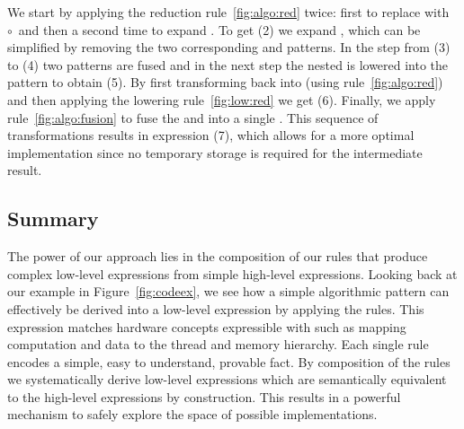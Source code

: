 We start by applying the reduction rule~\ref{fig:algo:red} twice:
first to replace \reduce with \reduce~$\circ$~\partRed and then a second time to expand \partRed.
To get (2) we expand \map, which can be simplified by removing the two corresponding \join and \splitN patterns.
In the step from (3) to (4) two \map patterns are fused and in the next step the nested \map is lowered into the \mapSeq pattern to obtain (5).
By first transforming \partRed back into \reduce (using rule~\ref{fig:algo:red}) and then applying the lowering rule~\ref{fig:low:red} we get (6).
Finally, we apply rule~\ref{fig:algo:fusion} to fuse the \mapSeq and \reduceSeq into a single \reduceSeq.
This sequence of transformations results in expression (7), which allows for a more optimal implementation since no temporary storage is required for the intermediate result.



\FloatBarrier



\subsection{Summary}

The power of our approach lies in the composition of our rules that produce complex low-level expressions from simple high-level expressions.
Looking back at our example in Figure~\ref{fig:codeex}, we see how a simple algorithmic pattern can effectively be derived into a low-level expression by applying the rules.
This expression matches hardware concepts expressible with \OpenCL such as mapping computation and data to the thread and memory hierarchy. %
Each single rule encodes a simple, easy to understand, provable fact.
By composition of the rules we systematically derive low-level expressions which are semantically equivalent to the high-level expressions by construction.
This results in a powerful mechanism to safely explore the space of possible implementations.


